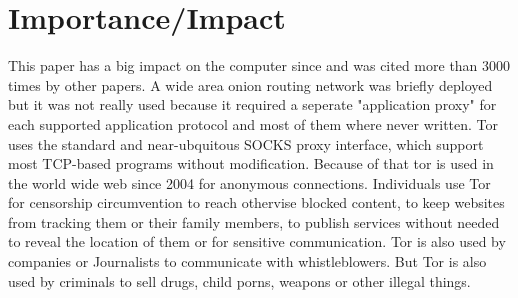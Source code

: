 \section{Importance/Impact}
This paper has a big impact on the computer since and was cited more than 3000 times by other papers. A wide area onion routing network was briefly deployed but it was not really used because it required a seperate "application proxy" for each supported application protocol and most of them where never written. Tor uses the standard and near-ubquitous SOCKS proxy interface, which support most TCP-based programs without modification.
Because of that tor is used in the world wide web since 2004 for anonymous connections. Individuals use Tor for censorship circumvention to reach othervise blocked content, to keep websites from tracking them or their family members, to publish services without needed to reveal the location of them or for sensitive communication. Tor is also used by companies or Journalists to communicate with whistleblowers\cite{tor}. But Tor is also used by criminals to sell drugs, child porns, weapons or other illegal things.   